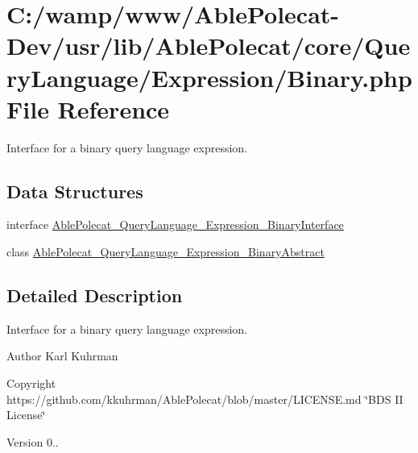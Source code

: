 \hypertarget{_binary_8php}{}\section{C\+:/wamp/www/\+Able\+Polecat-\/\+Dev/usr/lib/\+Able\+Polecat/core/\+Query\+Language/\+Expression/\+Binary.php File Reference}
\label{_binary_8php}


Interface for a binary query language expression.  


\subsection*{Data Structures}
\begin{DoxyCompactItemize}
\item 
interface \hyperlink{interface_able_polecat___query_language___expression___binary_interface}{Able\+Polecat\+\_\+\+Query\+Language\+\_\+\+Expression\+\_\+\+Binary\+Interface}
\item 
class \hyperlink{class_able_polecat___query_language___expression___binary_abstract}{Able\+Polecat\+\_\+\+Query\+Language\+\_\+\+Expression\+\_\+\+Binary\+Abstract}
\end{DoxyCompactItemize}


\subsection{Detailed Description}
Interface for a binary query language expression. 

\begin{DoxyAuthor}{Author}
Karl Kuhrman 
\end{DoxyAuthor}
\begin{DoxyCopyright}{Copyright}
https\+://github.com/kkuhrman/\+Able\+Polecat/blob/master/\+L\+I\+C\+E\+N\+S\+E.\+md \char`\"{}\+B\+D\+S I\+I License\char`\"{} 
\end{DoxyCopyright}
\begin{DoxyVersion}{Version}
0.. 
\end{DoxyVersion}
